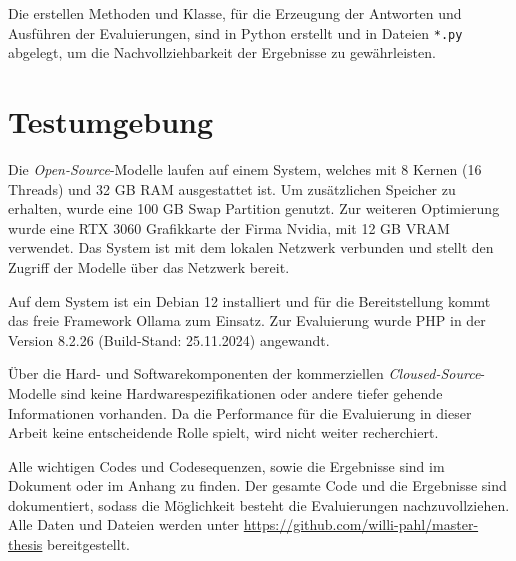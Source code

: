 Die erstellen Methoden und Klasse, für die Erzeugung der Antworten und Ausführen der Evaluierungen, sind in Python erstellt und in Dateien \texttt{*.py} abgelegt, um die Nachvollziehbarkeit der Ergebnisse zu gewährleisten.



\section{Testumgebung}
Die \textit{Open-Source}-Modelle laufen auf einem System, welches mit 8 Kernen (16 Threads) und 32 GB \acrshort{RAM} ausgestattet ist. Um zusätzlichen Speicher zu erhalten, wurde eine 100 GB Swap Partition genutzt. Zur weiteren Optimierung wurde eine RTX 3060 Grafikkarte der Firma Nvidia, mit 12 GB \acrshort{VRAM} verwendet. Das System ist mit dem lokalen Netzwerk verbunden und stellt den Zugriff der Modelle über das Netzwerk bereit.\vspace{0.2cm}

Auf dem System ist ein Debian 12 installiert und für die Bereitstellung kommt das freie Framework Ollama zum Einsatz. Zur Evaluierung wurde PHP in der Version 8.2.26 (Build-Stand: 25.11.2024) angewandt.\vspace{0.2cm}

Über die Hard- und Softwarekomponenten der kommerziellen \textit{Cloused-Source}-Modelle sind keine Hardwarespezifikationen oder andere tiefer gehende Informationen vorhanden. Da die Performance für die Evaluierung in dieser Arbeit keine entscheidende Rolle spielt, wird nicht weiter recherchiert.\vspace{0.2cm}

Alle wichtigen Codes und Codesequenzen, sowie die Ergebnisse sind im Dokument oder im Anhang zu finden. Der gesamte Code und die Ergebnisse sind dokumentiert, sodass die Möglichkeit besteht die Evaluierungen nachzuvollziehen. Alle Daten und Dateien werden unter \href{https://github.com/willi-pahl/master-thesis}{https://github.com/willi-pahl/master-thesis} bereitgestellt.\vspace{0.2cm}
